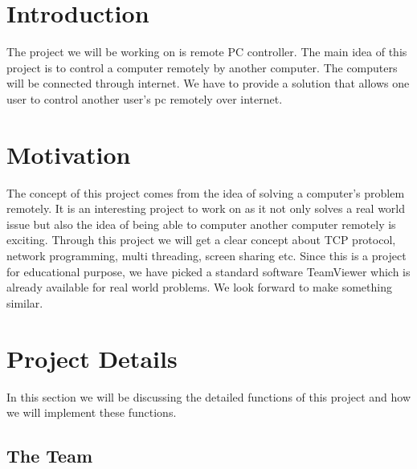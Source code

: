 \documentclass[12pt, a4paper]{article}
\begin{document}

 
 
\tableofcontents

\newpage

 
\section{Introduction}

The project we will be working on is remote PC controller. The main idea of this project is to control a computer remotely by another computer. The computers will be connected through internet. We have to provide a solution that allows one user to control another user's pc remotely over internet.

\section{Motivation}

The concept of this project comes from the idea of solving a computer's problem remotely. It is an interesting project to work on as it not only solves a real world issue but also the idea of being able to computer another computer remotely is exciting. Through this project we will get a clear concept about TCP protocol, network programming, multi threading, screen sharing etc. Since this is a project for educational purpose, we have picked a standard software TeamViewer which is already available for real world problems. We look forward to make something similar.

\section{Project Details}

In this section we will be discussing the detailed functions of this project and how we will implement these functions.

\subsection{The Team}
\end{document}
